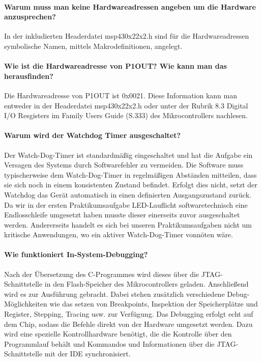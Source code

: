 \documentclass[12pt,a4paper,bibliography=totocnumbered,listof=totocnumbered]{scrartcl}
\begin{document}
\paragraph{Warum muss man keine Hardwareadressen angeben um die Hardware anzusprechen?}
In der inkludierten Headerdatei msp430x22x2.h sind für die Hardwareadressen symbolische Namen, mittels Makrodefinitionen, angelegt.
\paragraph{Wie ist die Hardwareadresse von P1OUT? Wie kann man das herausfinden?}
Die Hardwareadresse von P1OUT ist 0x0021. Diese Information kann man entweder in der Headerdatei msp430x22x2.h oder unter der Rubrik 8.3 Digital I/O Resgisters im Family Users Guide (S.333) des Mikrocontrollers nachlesen. 
\paragraph{Warum wird der Watchdog Timer ausgeschaltet?}
Der Watch-Dog-Timer ist standardmäßig eingeschaltet und hat die Aufgabe ein Versagen des Systems durch Softwarefehler zu vermeiden. Die Software muss typischerweise dem Watch-Dog-Timer in regelmäßigen Abständen mitteilen, dass sie sich noch in einem konsistenten Zustand befindet. Erfolgt dies nicht, setzt der Watchdog das Gerät automatisch in einen definierten Ausgangszustand zurück. Da wir in der ersten Praktikumsaufgabe LED-Lauflicht softwaretechnisch eine Endlosschleife  umgesetzt haben musste dieser einerseits zuvor ausgeschaltet werden. Andererseits handelt es sich bei unseren Praktikumsaufgaben nicht um kritische Anwendungen, wo ein aktiver Watch-Dog-Timer vonnöten wäre.
\paragraph{Wie funktioniert In-System-Debugging?}
Nach der Übersetzung des C-Programmes wird dieses über die JTAG-Schnittstelle in den Flash-Speicher des Mikrocontrollers geladen. Anschließend wird es zur Ausführung gebracht. Dabei stehen zusätzlich verschiedene Debug-Möglichkeiten wie das setzen von Breakpoints, Inspektion der Speicherplätze und Register, Stepping, Tracing usw. zur Verfügung. Das Debugging erfolgt echt auf dem Chip, sodass die Befehle direkt von der Hardware umgesetzt werden. Dazu wird eine spezielle Kontrollhardware benötigt, die die Kontrolle über den Programmlauf behält und Kommandos und Informationen über die JTAG-Schnittstelle mit der IDE synchronisiert.
\end{document}
